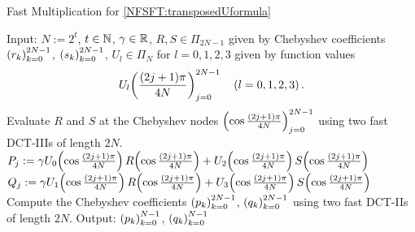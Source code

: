 \begin{algorithm}[htb]
  \caption{Fast Multiplication for \eqref{NFSFT:transposedUformula}}
  \label{NFSFT:Algorithm:Utransposed}
  \begin{algorithmic}
    \STATE Input:  $N := 2^t$, $t \in \mathbb{N}$, $\gamma \in \mathbb{R}$, $R,S \in \Pi_{2N-1}$ given by Chebyshev coefficients \\
    \STATE {} $\left(r_{k}\right)_{k=0}^{2N-1}$, $\left(s_{k}\right)_{k=0}^{2N-1}$, $U_{l} \in \Pi_{N}$ for $l=0,1,2,3$ 
      given by function values
      \[U_{l}{\hspace{-0.4ex}}\left(\frac{(2j+1)\pi}{4N}\right)_{j = 0}^{2N-1} \quad \left(l=0,1,2,3\right).\] 
    \STATE Evaluate $R$ and $S$ at the Chebyshev nodes $\left(\cos \frac{(2j+1)\pi}{4N}\right)_{j = 0}^{2N-1}$
      using two fast DCT-IIIs of length $2N$.
    \STATE 
      \STATE $P_{j} := \gamma U_{0}{\hspace{-0.4ex}}\left(\cos \frac{(2j+1)\pi}{4N}\right) R{\hspace{-0.4ex}}\left(\cos \frac{(2j+1)\pi}{4N}\right) +
                              U_{2}{\hspace{-0.4ex}}\left(\cos \frac{(2j+1)\pi}{4N}\right) S{\hspace{-0.4ex}}\left(\cos \frac{(2j+1)\pi}{4N}\right)$
      \STATE $Q_{j} := \gamma U_{1}{\hspace{-0.4ex}}\left(\cos \frac{(2j+1)\pi}{4N}\right) R{\hspace{-0.4ex}}\left(\cos \frac{(2j+1)\pi}{4N}\right) +
                              U_{3}{\hspace{-0.4ex}}\left(\cos \frac{(2j+1)\pi}{4N}\right) S{\hspace{-0.4ex}}\left(\cos \frac{(2j+1)\pi}{4N}\right)$
    \ENDFOR
    \STATE
    \STATE Compute the Chebyshev coefficients $\left(p_{k}\right)_{k=0}^{2N-1}$, $\left(q_{k}\right)_{k=0}^{2N-1}$ 
      using two fast DCT-IIs of length $2N$.
    \STATE
    \STATE Output: $\left(p_{k}\right)_{k=0}^{N-1}$, $\left(q_{k}\right)_{k=0}^{N-1}$
  \end{algorithmic}
\end{algorithm}  

